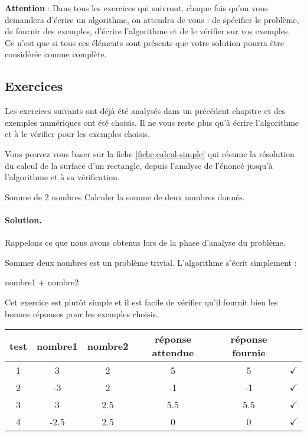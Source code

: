 			\bigskip
			\textbf{Attention} : 
			Dans tous les exercices qui suivront,
			chaque fois qu’on vous demandera d’écrire un algorithme,
			on attendra de vous : de spécifier le problème,
			de fournir des exemples, d’écrire l’algorithme
			et de le vérifier sur vos exemples.
			Ce n’est que si tous ces éléments sont présents
			que votre solution pourra être considérée comme complète.

		\subsection{Exercices}\label{prem-ex-simple}

			Les exercices suivants ont déjà été analysés 
			dans un précédent chapitre
			et des exemples numériques ont été choisis.
			Il ne vous reste plus qu’à écrire l’algorithme
			et à le vérifier pour les exemples choisis.

			Vous pouvez vous baser sur la fiche \vref{fiche:calcul-simple} 
			qui résume la résolution 
			du calcul de la surface d’un rectangle,
			depuis l’analyse de l’énoncé jusqu’à l’algorithme
			et à sa vérification.
	
			\begin{Exercice}{Somme de 2 nombres}
				Calculer la somme de deux nombres donnés.
				\paragraph{Solution.}
				Rappelons ce que nous avons obtenus 
				lors de la phase d’analyse du problème.
				\begin{center}
				\end{center}
				Sommer deux nombres est un problème trivial.
				L’algorithme s’écrit simplement :			
				\begin{LDA}
						\Return nombre1 + nombre2
					\EndAlgo
				\end{LDA}
				Cet exercice est plutôt simple 
				et il est facile de vérifier qu’il fournit
				bien les bonnes réponses pour les exemples choisis.				
				\begin{center}
					\begin{tabular}{|c|cccc|c|}
					\hline
					test \no & nombre1 & nombre2 & réponse attendue & réponse fournie & {} \\\hline
					\hline 
					1 & 3    & 2   & 5   & 5   & {\color{ForestGreen}$\checkmark$} \\\hline
					2 & -3   & 2   & -1  & -1  & {\color{ForestGreen}$\checkmark$} \\\hline
					3 & 3    & 2.5 & 5.5 & 5.5 & {\color{ForestGreen}$\checkmark$} \\\hline
					4 & -2.5 & 2.5 & 0   & 0   & {\color{ForestGreen}$\checkmark$} \\\hline
					\end{tabular}
				\end{center}				
			\end{Exercice}
		
